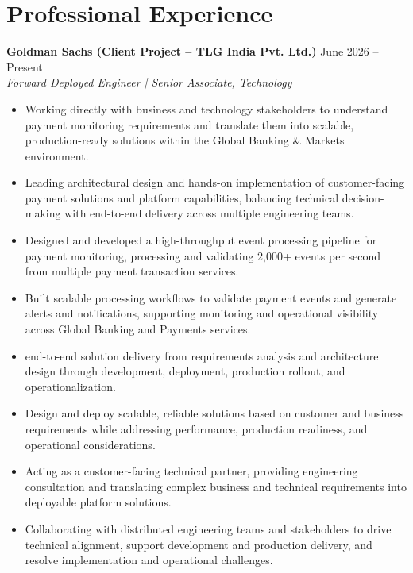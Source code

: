 \documentclass[11pt,a4paper]{article}
\begin{document}
\section*{Professional Experience}

\textbf{Goldman Sachs (Client Project -- TLG India Pvt. Ltd.)} \hfill June 2026 -- Present \\
\textit{Forward Deployed Engineer | Senior Associate, Technology}

\begin{itemize}

    \item Working directly with business and technology stakeholders to understand payment monitoring requirements and translate them into scalable, production-ready solutions within the Global Banking \& Markets environment.

    \item Leading architectural design and hands-on implementation of customer-facing payment solutions and platform capabilities, balancing technical decision-making with end-to-end delivery across multiple engineering teams.

    \item Designed and developed a high-throughput event processing pipeline for payment monitoring, processing and validating 2,000+ events per second from multiple payment transaction services.

    \item Built scalable processing workflows to validate payment events and generate alerts and notifications, supporting monitoring and operational visibility across Global Banking and Payments services.

    \item end-to-end solution delivery from requirements analysis and architecture design through development, deployment, production rollout, and operationalization.

    \item Design and deploy scalable, reliable solutions based on customer and business requirements while addressing performance, production readiness, and operational considerations.

    \item Acting as a customer-facing technical partner, providing engineering consultation and translating complex business and technical requirements into deployable platform solutions.

    \item Collaborating with distributed engineering teams and stakeholders to drive technical alignment, support development and production delivery, and resolve implementation and operational challenges.

\end{itemize}
\end{document}
